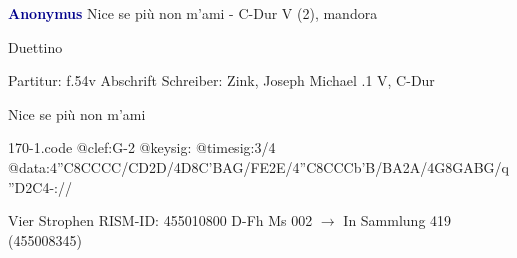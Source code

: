 \documentclass[twocolumn]{book}
\begin{document}
\newline \par \vspace{7pt} \textcolor{darkblue}{\textbf{Anonymus  }}
\newline Nice se più non m'ami - C-Dur
\newline V (2), mandora
\newline \begin{itshape}[at left, f.54v:] Duettino\end{itshape} 
\newline \textcolor{darkblue}{}  Partitur: f.54v
\newline Abschrift
\newline Schreiber: Zink, Joseph Michael
.1  V, C-Dur
\newline \begin{footnotesize} Nice se più non m'ami \end{footnotesize}  
\begin{filecontents*}{170-1.code}
@clef:G-2
@keysig:
@timesig:3/4
@data:4''C8CCCC/{CD}2D/4D8C'BAG/{FE}2E/4''C8CCCb'B/{BA}2A/4G8GABG/q''D2C4-://
\end{filecontents*}
\newline
%
\newline Vier Strophen
\newline RISM-ID: 455010800
\newline D-Fh  Ms 002
\newline $\rightarrow$ In Sammlung 419 (455008345)
      
\end{document}
